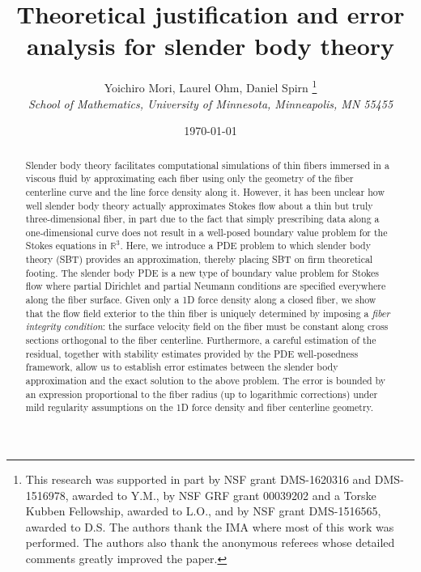 \documentclass[11pt]{article}
\numberwithin{equation}{section}
\newcommand{\R}{\mathbb{R}}
\theoremstyle{definition}
\begin{document}
\title{Theoretical justification and error analysis for slender body theory}
\author{Yoichiro Mori, Laurel Ohm, Daniel Spirn
\footnote{This research was supported in part by NSF grant DMS-1620316 and DMS-1516978, awarded to Y.M., by NSF GRF grant 00039202 and a Torske Kubben Fellowship, awarded to L.O., and by NSF grant DMS-1516565, awarded to D.S. The authors thank the IMA where most of this work was performed. The authors also thank the anonymous referees whose detailed comments greatly improved the paper.}\\ \textit{\small School of Mathematics, University of Minnesota, Minneapolis, MN 55455}}
\date{\today}

\maketitle

\begin{abstract}
Slender body theory facilitates computational simulations of thin fibers immersed in a viscous fluid by approximating each fiber using only the geometry of the fiber centerline curve and the line force density along it. However, it has been unclear how well slender body theory actually approximates Stokes flow about a thin but truly three-dimensional fiber, in part due to the fact that simply prescribing data along a one-dimensional curve does not result in a well-posed boundary value problem for the Stokes equations in $\R^3$. Here, we introduce a PDE problem to which slender body theory (SBT) provides an approximation, thereby placing SBT on firm theoretical footing. The slender body PDE is a new type of boundary value problem for Stokes flow where partial Dirichlet and partial Neumann conditions are specified everywhere along the fiber surface. Given only a 1D force density along a closed fiber, we show that the flow field exterior to the thin fiber is uniquely determined by imposing a {\em fiber integrity condition}: the surface velocity field on the fiber must be constant along cross sections orthogonal to the fiber centerline. Furthermore, a careful estimation of the residual, together with stability estimates provided by the PDE well-posedness framework, allow us to establish error estimates between the slender body approximation and the exact solution to the above problem. The error is bounded by an expression proportional to the fiber radius (up to logarithmic corrections) under mild regularity assumptions on the 1D force density and fiber centerline geometry.
\end{abstract}
\end{document}
